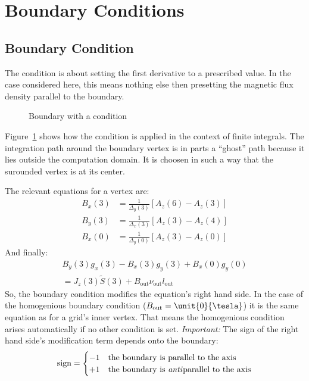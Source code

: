 \section{Boundary Conditions}
\label{sec:bound-treatm-cond}

\subsection{ Boundary Condition}
\label{sec:neumann}

The  condition is about setting the first
derivative to a prescribed value.  In the case considered here, this
means nothing else then presetting the magnetic flux density parallel
to the boundary.
\begin{figure}
  \centering
  
  \caption{Boundary with a  condition}
  \label{fig:neumann-boundary}
\end{figure}
Figure~\ref{fig:neumann-boundary} shows how the 
condition is applied in the context of finite integrals.  The
integration path around the boundary vertex is in parts a ``ghost'' path
because it lies outside the computation domain.  It is choosen in such
a way that the surounded vertex is at its center.  \par The relevant
equations for a  vertex are:
\begin{align*}
  B_x(3)&=\frac{1}{\Delta_y(3)}\left[A_z(6)-A_z(3)\right]  \\
  B_y(3)&=\frac{1}{\Delta_x(3)}\left[A_z(3)-A_z(4)\right]  \\
  B_x(0)&=\frac{1}{\Delta_y(0)}\left[A_z(3)-A_z(0)\right]
\end{align*}
And finally:
\begin{multline}
  \label{eq:19}
  B_y(3)g_x(3)-B_x(3)g_y(3)+B_x(0)g_y(0) \\
  =J_z(3)\tilde{S}(3)+B_{\text{out}}\nu_{\text{out}}l_{\text{out}}
\end{multline}
So, the  boundary condition modifies the
equation's right hand side.  In the case of the homogenious
 boundary condition
($B_{\text{out}}=\unit{0}{\tesla}$) it is the same equation as for a
grid's inner vertex.  That means the homogenious 
condition arises automatically if no other condition is set.
\emph{Important:}  The sign of the right hand side's modification term
depends onto the boundary:
\begin{gather*}
  \text{sign}=
  \begin{cases}
    -1 & \text{the boundary is parallel to the axis} \\
    +1 & \text{the boundary is \emph{anti}parallel to the axis}
  \end{cases}
\end{gather*}

